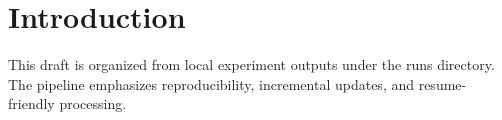 \section{Introduction}
This draft is organized from local experiment outputs under the runs directory. The pipeline emphasizes reproducibility, incremental updates, and resume-friendly processing.
